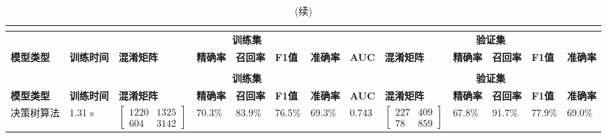 \begin{landscape}
      \begin{longtable}{m{3cm}<{\centering}m{1.7cm}<{\centering}m{2.3cm}<{\centering}m{1cm}<{\centering}m{1cm}<{\centering}m{1cm}<{\centering}m{1cm}<{\centering}m{1cm}<{\centering}m{2cm}<{\centering}m{1cm}<{\centering}m{1cm}<{\centering}m{1cm}<{\centering}m{1cm}<{\centering}}
            \caption{初筛结果}\\
            \label{tab:model_screen}\\
            \toprule
            &  & \multicolumn{6}{c}{\textbf{训练集}} & \multicolumn{5}{c}{\textbf{验证集}}                                                                                                                                                                                                      \\
            \multirow{-2}{*}{\textbf{模型类型}} & \multirow{-2}{*}{\textbf{训练时间}} & \textbf{混淆矩阵} &  \textbf{精确率} &  \textbf{召回率} &  \textbf{F1值} &  \textbf{准确率} &  \textbf{AUC} &  \textbf{混淆矩阵} &  \textbf{精确率} &  \textbf{召回率} &  \textbf{F1值} &  \textbf{准确率}    \\
            \midrule
            \endfirsthead
            \caption[]{(续)}\\
            \midrule
            &  & \multicolumn{6}{c}{\textbf{训练集}} & \multicolumn{5}{c}{\textbf{验证集}}                                                                                                                                                                                                      \\
            \multirow{-2}{*}{\textbf{模型类型}} & \multirow{-2}{*}{\textbf{训练时间}} & \textbf{混淆矩阵} &  \textbf{精确率} &  \textbf{召回率} &  \textbf{F1值} &  \textbf{准确率} &  \textbf{AUC} &  \textbf{混淆矩阵} &  \textbf{精确率} &  \textbf{召回率} &  \textbf{F1值} &  \textbf{准确率}    \\
            \midrule
            \endhead 
            \midrule
            \endfoot
            \bottomrule
            \endlastfoot
            决策树算法      &   1.31 s  &     $\left[ \begin{array}{cc} 1220 & 1325 \\ 604 & 3142 \end{array} \right]$ & 70.3\% & 83.9\% &76.5\% & 69.3\% & 0.743 &
            $\left[ \begin{array}{cc} 227 & 409 \\ 78 & 859 \end{array} \right]$ & 67.8\% & 91.7\% & 77.9\% & 69.0\% \\

\end{longtable}
\end{landscape}
